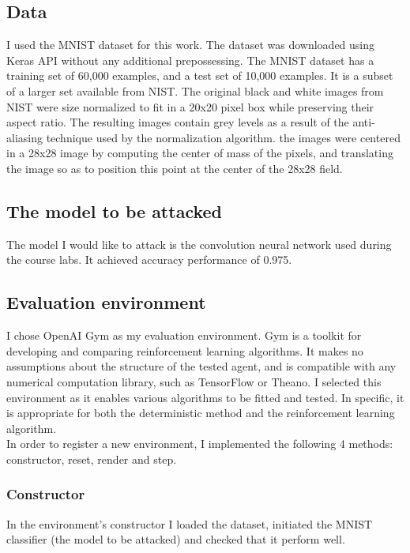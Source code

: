 \documentclass{article}
\begin{document}
\subsection{Data}
I used the MNIST \cite{mnist10027939599} dataset for this work. The dataset was downloaded using Keras API without any additional prepossessing. 
The MNIST dataset has a training set of 60,000 examples, and a test set of 10,000 examples. It is a subset of a larger set available from NIST. The original black and white images from NIST were size normalized to fit in a 20x20 pixel box while preserving their aspect ratio. The resulting images contain grey levels as a result of the anti-aliasing technique used by the normalization algorithm. the images were centered in a 28x28 image by computing the center of mass of the pixels, and translating the image so as to position this point at the center of the 28x28 field. \\

\subsection{The model to be attacked}
The model I would like to attack is the convolution neural network used during the course labs. It achieved accuracy performance of 0.975.

\subsection{Evaluation environment}
I chose OpenAI Gym \cite{brockman2016openai} as my evaluation environment. Gym is a toolkit for developing and comparing reinforcement learning algorithms. It makes no assumptions about the structure of the tested agent, and is compatible with any numerical computation library, such as TensorFlow or Theano.
I selected this environment as it enables various algorithms to be fitted and tested. In specific, it is appropriate for both the deterministic method and the reinforcement learning algorithm. \\
In order to register a new environment, I implemented the following 4 methods: constructor, reset, render and step.
\subsubsection{Constructor}
In the environment's constructor I loaded the dataset, initiated the MNIST classifier (the model to be attacked) and checked that it perform well.
\end{document}

